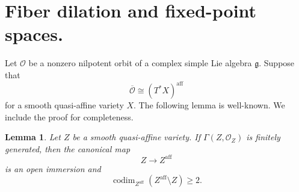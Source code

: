 \documentclass[10pt,a4paper]{amsart}
\newtheorem{lemma}[theorem]{Lemma}
\newcommand{\aff}{\mathrm{aff}}
\begin{document}
\section{Fiber dilation and fixed-point spaces.}\label{sec:fiber}

Let $\mathcal O$ be a nonzero nilpotent orbit of a complex simple Lie
algebra $\mathfrak g$. Suppose that
\[
\overline{\mathcal O}\cong(T^*X)^{\aff}
\]
for a smooth quasi-affine variety $X$.
The following lemma is well-known. We include the proof for
completeness.

\begin{lemma}\label{lem:small-boundary}
Let $Z$ be a smooth quasi-affine variety. If
$\Gamma(Z,\mathcal O_Z)$ is finitely generated, then the canonical map
\[
Z\longrightarrow Z^{\aff}
\]
is an open immersion and
\[
\operatorname{codim}_{Z^{\aff}}(Z^{\aff}\setminus Z)\geq2.
\]
\end{lemma}
\end{document}
